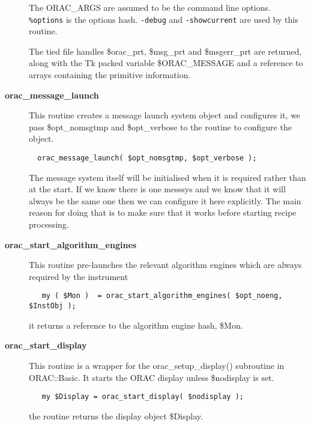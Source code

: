 \begin{description}
The ORAC\_ARGS are assumed to be the command line options. \texttt{\%options}
is the options hash. \texttt{-debug} and \texttt{-showcurrent} are used by this
routine.



The tied file handles \$orac\_prt, \$msg\_prt and \$msgerr\_prt are
returned, along with the Tk packed variable \$ORAC\_MESSAGE and
a reference to arrays containing the primitive information.


\item[{\textbf{orac\_message\_launch}}] \mbox{}

This routine creates a message launch system object and configures it,
we pass \$opt\_nomsgtmp and \$opt\_verbose to the routine to configure the
object.

\begin{verbatim}
  orac_message_launch( $opt_nomsgtmp, $opt_verbose );
\end{verbatim}


The message system itself will be initialised when it is required
rather than at the start. If we know there is one messsys and we
know that it will always be the same one then we can configure it here explicitly. The main reason for doing that is to make sure that it
works before starting recipe processing.


\item[{\textbf{orac\_start\_algorithm\_engines}}] \mbox{}

This routine pre-launches the relevant algorithm engines which are always required by the instrument

\begin{verbatim}
   my ( $Mon )  = orac_start_algorithm_engines( $opt_noeng, $InstObj );
\end{verbatim}


it returns a reference to the algorithm engine hash, \$Mon.


\item[{\textbf{orac\_start\_display}}] \mbox{}

This routine is a wrapper for the orac\_setup\_display() subroutine in
ORAC::Basic. It starts the ORAC display unless \$nodisplay is
set.

\begin{verbatim}
   my $Display = orac_start_display( $nodisplay );
\end{verbatim}


the routine returns the display object \$Display.




\end{description}
